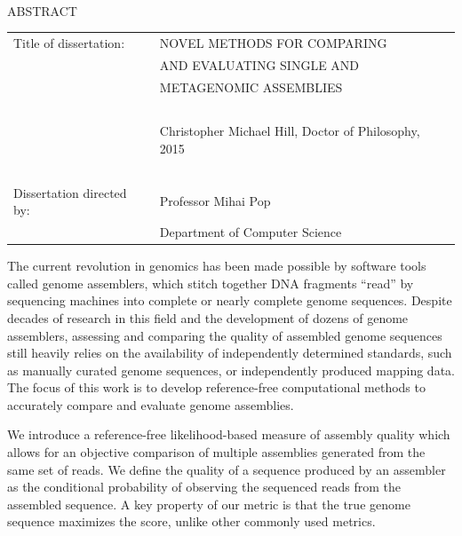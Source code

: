 \documentclass[12pt,\mydriver]{thesis}
\begin{document}
\clearpage{}
\hbox{\ }

\renewcommand{\baselinestretch}{1}
\small \normalsize

\begin{center}
\large{{ABSTRACT}}

\vspace{3em}

\end{center}
\hspace{-.15in}
\begin{tabular}{ll}
Title of dissertation:    & {\large  NOVEL METHODS FOR COMPARING}\\
&				      {\large AND EVALUATING SINGLE AND  } \\
&                     {\large METAGENOMIC ASSEMBLIES} \\
\ \\
&                          {\large  Christopher Michael Hill, Doctor of Philosophy, 2015} \\
\ \\
Dissertation directed by: & {\large  Professor Mihai Pop} \\
&  				{\large	 Department of Computer Science } \\
\end{tabular}

\vspace{3em}

\renewcommand{\baselinestretch}{2}
\large \normalsize


The current revolution in genomics has been made possible by software tools called genome assemblers, which stitch together DNA fragments ``read'' by sequencing machines into complete or nearly complete genome sequences. Despite decades of research in this field and the development of dozens of genome assemblers, assessing and comparing the quality of assembled genome sequences still heavily relies on the availability of independently determined standards, such as manually curated genome sequences, or independently produced mapping data. The focus of this work is to develop reference-free computational methods to accurately compare and evaluate genome assemblies.


We introduce a reference-free likelihood-based measure of assembly quality which allows for an objective comparison of multiple assemblies generated from the same set of reads. We define the quality of a sequence produced by an assembler as the conditional probability of observing the sequenced reads from the assembled sequence. A key property of our metric is that the true genome sequence maximizes the score, unlike other commonly used metrics.
\end{document}

